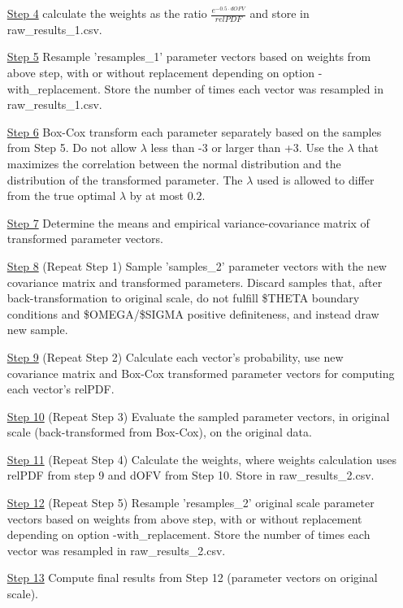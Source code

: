 \begin{itemize}
\item[\underline{Step 4}] calculate the weights as the ratio $\frac{e^{-0.5\cdot dOFV}}{relPDF}$ and store in
raw\_results\_1.csv.
\item[\underline{Step 5}] Resample 'resamples\_1' parameter vectors based on weights from above step,
with or without replacement depending on option -with\_replacement.
Store the number of times each vector was resampled in raw\_results\_1.csv.
\item[\underline{Step 6}] Box-Cox transform each parameter separately based on the samples from Step 5. Do not allow
$\lambda$ less than -3 or larger than +3. Use the $\lambda$ that maximizes the correlation between the normal distribution and
the distribution of the transformed parameter. The  $\lambda$ used is allowed to differ from the true optimal  $\lambda$
by at most $0.2$.
\item[\underline{Step 7}] Determine the means and empirical variance-covariance matrix of
transformed parameter vectors.
\item[\underline{Step 8}] (Repeat Step 1) Sample 'samples\_2' parameter vectors
with the new covariance matrix and transformed parameters.
Discard samples that, after back-transformation to original scale, do not
fulfill \$THETA boundary conditions and \$OMEGA/\$SIGMA positive definiteness, and instead draw new sample.
\item[\underline{Step 9}] (Repeat Step 2) Calculate each vector's probability,
use new covariance matrix and Box-Cox transformed parameter vectors for computing each vector's relPDF.
\item[\underline{Step 10}] (Repeat Step 3) Evaluate the sampled parameter vectors, in original scale (back-transformed from Box-Cox), on the original data.
\item[\underline{Step 11}] (Repeat Step 4) Calculate the weights,
where weights calculation uses relPDF from step 9 and dOFV from Step 10.
Store in raw\_results\_2.csv.
\item[\underline{Step 12}] (Repeat Step 5) Resample 'resamples\_2' original scale parameter vectors based on weights from above step,
with or without replacement depending on option -with\_replacement.
Store the number of times each vector was resampled in raw\_results\_2.csv.
\item[\underline{Step 13}] Compute final results from Step 12 (parameter vectors on original scale).
\end{itemize}



